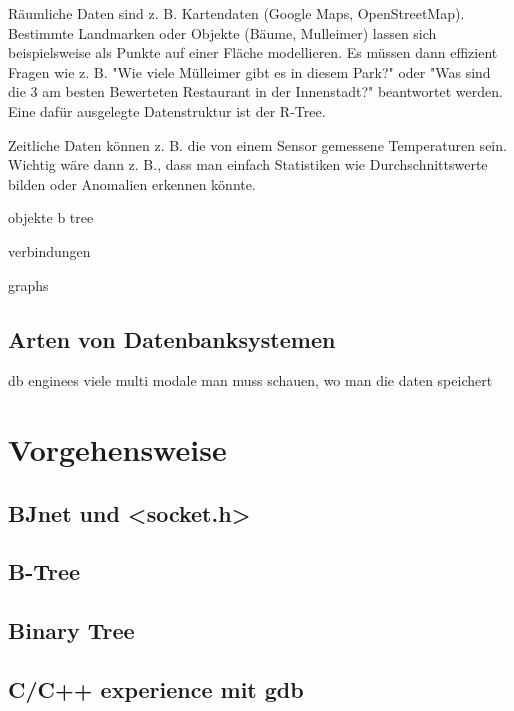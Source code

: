 \documentclass[11pt,a4paper]{article}
\begin{document}
\vspace*{0.3cm}

Räumliche Daten sind z. B. Kartendaten (Google Maps, OpenStreetMap). Bestimmte Landmarken oder Objekte
(Bäume, Mulleimer) lassen sich beispielsweise als Punkte auf einer Fläche modellieren.
Es müssen dann effizient Fragen wie z. B. "Wie viele Mülleimer gibt es in diesem Park?" oder "Was sind
die 3 am besten Bewerteten Restaurant in der Innenstadt?" beantwortet werden.
Eine dafür ausgelegte Datenstruktur ist der R-Tree.

\vspace*{0.3cm}

Zeitliche Daten können z. B. die von einem Sensor gemessene Temperaturen sein.
Wichtig wäre dann z. B., dass man einfach Statistiken wie Durchschnittswerte bilden
oder Anomalien erkennen könnte.

\vspace*{0.3cm}

objekte
b tree

\vspace*{0.3cm}

verbindungen

graphs

\subsection{Arten von Datenbanksystemen}

db enginees
viele multi modale
man muss schauen, wo man die daten speichert

\section{Vorgehensweise}

\subsection{BJnet und <socket.h>}
\subsection{B-Tree}

\subsection{Binary Tree}

\subsection{C/C++ experience mit gdb}
\end{document}
